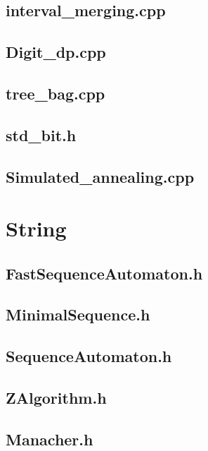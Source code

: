 \subsection{interval\_merging.cpp}

\subsection{Digit\_dp.cpp}

\subsection{tree\_bag.cpp}

\subsection{std\_bit.h}

\subsection{Simulated\_annealing.cpp}

\section{String}
\subsection{FastSequenceAutomaton.h}

\subsection{MinimalSequence.h}

\subsection{SequenceAutomaton.h}

\subsection{ZAlgorithm.h}

\subsection{Manacher.h}

